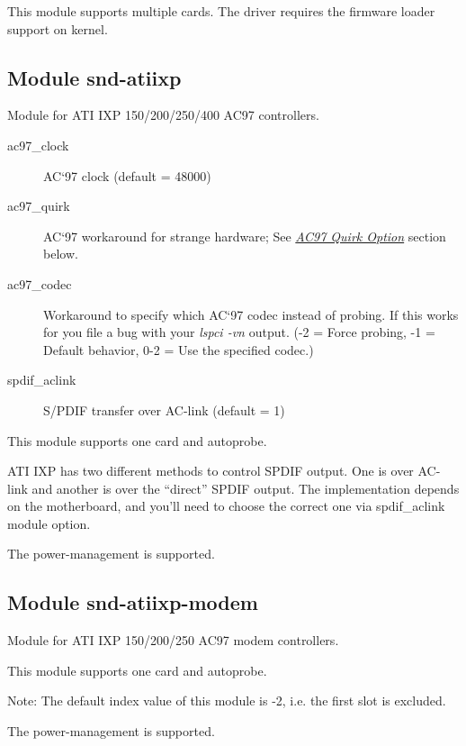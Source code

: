 \documentclass[a4paper,8pt,english]{sphinxmanual}
\begin{document}
This module supports multiple cards.
The driver requires the firmware loader support on kernel.


\subsection{Module snd-atiixp}
\label{sound/alsa-configuration:module-snd-atiixp}
Module for ATI IXP 150/200/250/400 AC97 controllers.
\begin{description}
\item[{ac97\_clock}] \leavevmode
AC`97 clock (default = 48000)

\item[{ac97\_quirk}] \leavevmode
AC`97 workaround for strange hardware;
See {\hyperref[sound/alsa\string-configuration:ac97\string-quirk\string-option]{\emph{AC97 Quirk Option}}} section below.

\item[{ac97\_codec}] \leavevmode
Workaround to specify which AC`97 codec instead of probing.
If this works for you file a bug with your \emph{lspci -vn} output.
(-2 = Force probing, -1 = Default behavior, 0-2 = Use the
specified codec.)

\item[{spdif\_aclink}] \leavevmode
S/PDIF transfer over AC-link (default = 1)

\end{description}

This module supports one card and autoprobe.

ATI IXP has two different methods to control SPDIF output.  One is
over AC-link and another is over the ``direct'' SPDIF output.  The
implementation depends on the motherboard, and you'll need to
choose the correct one via spdif\_aclink module option.

The power-management is supported.


\subsection{Module snd-atiixp-modem}
\label{sound/alsa-configuration:module-snd-atiixp-modem}
Module for ATI IXP 150/200/250 AC97 modem controllers.

This module supports one card and autoprobe.

Note: The default index value of this module is -2, i.e. the first
slot is excluded.

The power-management is supported.
\end{document}
